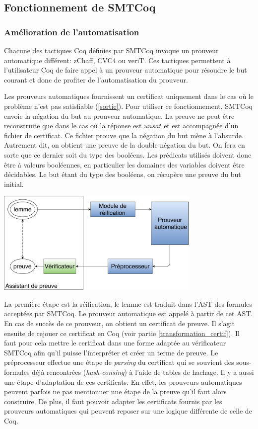 \documentclass[11pt]{article}
\begin{document}
\subsection{Fonctionnement de SMTCoq}

\subsubsection{Amélioration de l'automatisation}\label{negation}

Chacune des tactiques Coq définies par SMTCoq invoque un prouveur automatique différent: zChaff, CVC4 ou veriT. Ces tactiques permettent à l'utilisateur Coq de faire appel à un prouveur automatique pour résoudre le but courant et donc de profiter de l'automatisation du prouveur. \medbreak



Les prouveurs automatiques fournissent un certificat uniquement dans le cas où le problème n'est pas satisfiable (\ref{sortie}). Pour utiliser ce fonctionnement, SMTCoq envoie la négation du but au prouveur automatique. La preuve ne peut être reconstruite que dans le cas où la réponse est $unsat$ et est accompagnée d'un fichier de certificat. Ce fichier prouve que la négation du but mène à l'absurde. Autrement dit, on obtient une preuve de la double négation du but. On fera en sorte que ce dernier soit du type des booléens. Les prédicats utilisés doivent donc être à valeurs booléennes, en particulier les domaines des variables doivent être décidables.  Le but étant du type des booléens, on récupère une preuve du but initial.

\begin{center}
    \includegraphics[height=5cm]{Automatisation.pdf}
\end{center}

La première étape est la réification, le lemme est traduit dans l'AST des formules acceptées par SMTCoq. Le prouveur automatique est appelé à partir de cet AST. En cas de succès de ce prouveur, on obtient un certificat de preuve. 
Il s'agit ensuite de rejouer ce certificat en Coq (voir partie \ref{transformation_certif}). Il faut pour cela mettre le certificat dans une forme adaptée au vérificateur SMTCoq afin qu'il puisse l'interpréter et créer un terme de preuve. Le préprocesseur effectue une étape de \textit{parsing} du certificat qui se souvient des sous-formules déjà rencontrées (\textit{hash-consing}) à l'aide de tables de hachage.  Il y a aussi une étape d'adaptation de ces certificats. En effet, les prouveurs automatiques peuvent parfois ne pas mentionner une étape de la preuve qu'il faut alors construire. De plus, il faut pouvoir adapter les certificats fournis par les prouveurs automatiques qui peuvent reposer sur une logique différente de celle de Coq. 
\end{document}

